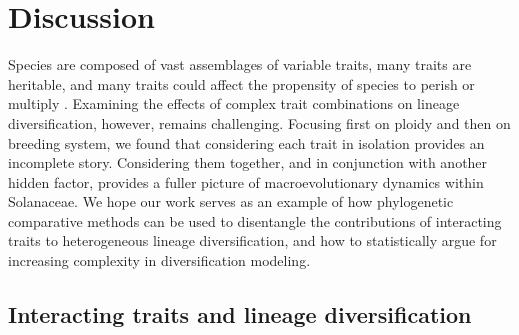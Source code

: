 \section{Discussion}

%
Species are composed of vast assemblages of variable traits, many traits are heritable, and many traits could affect the propensity of species to perish or multiply \citep{lewontin_1970}.
Examining the effects of complex trait combinations on lineage diversification, however, remains challenging.
%
Focusing first on ploidy and then on breeding system, we found that considering each trait in isolation provides an incomplete story.
Considering them together, and in conjunction with another hidden factor, provides a fuller picture of macroevolutionary dynamics within Solanaceae.
We hope our work serves as an example of how phylogenetic comparative methods can be used to disentangle the contributions of interacting traits to heterogeneous lineage diversification, and how to statistically argue for increasing complexity in diversification modeling.

\subsection{Interacting traits and lineage diversification} 

